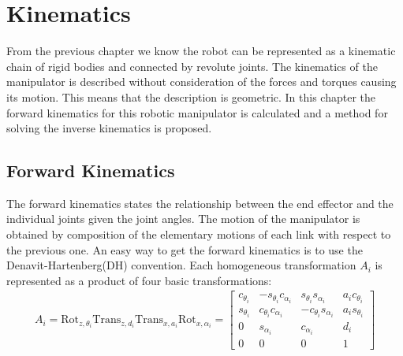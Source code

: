 \chapter{Kinematics}\label{chap:kinematics}
From the previous chapter we know the robot can be represented as a kinematic chain of rigid bodies and connected by revolute joints\cite{Siciliano}. The kinematics of the manipulator is described without consideration of the forces and torques causing its motion. This means that the description is geometric\cite{spong}. In this chapter the forward kinematics for this robotic manipulator is calculated and a method for solving the inverse kinematics is proposed. 

\section{Forward Kinematics}
The forward kinematics states the relationship between the end effector and the individual joints given the joint angles. The motion of the manipulator is obtained by composition of the elementary motions of each link with respect to the previous one\cite{Siciliano}. An easy way to get the forward kinematics is to use the Denavit-Hartenberg(DH) convention. Each homogeneous transformation $A_i$ is represented as a product of four basic transformations\cite{spong}: 
\begin{align}\label{eq:Ai}
A_i = \text{Rot}_{z,\theta_i}\text{Trans}_{z,d_i}\text{Trans}_{x,a_i}\text{Rot}_{x,\alpha_i}=
    \begin{bmatrix}
        c_{\theta_i} & -s_{\theta_i}c_{\alpha_i} & s_{\theta_i}s_{\alpha_i} & a_ic_{\theta_i}\\
        s_{\theta_i} & c_{\theta_i}c_{\alpha_i} & -c_{\theta_i}s_{\alpha_i} & a_is_{\theta_i}\\
        0 & s_{\alpha_i} & c_{\alpha_i} &d_i\\
        0 & 0 & 0 & 1
    \end{bmatrix}    
\end{align}


